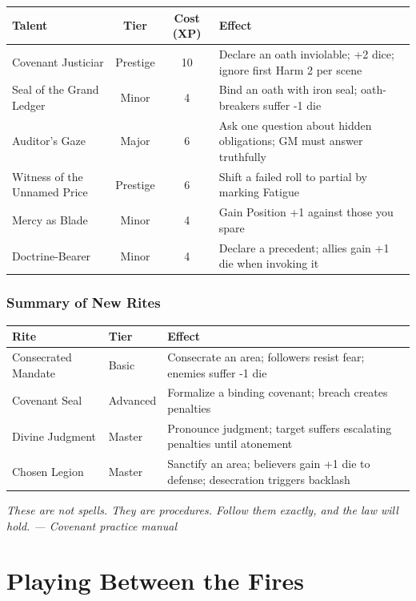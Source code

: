 \documentclass{book}
\newcommand{\citation}[1]{\textcolor{marginalia}{\small\textit{#1}}}
\begin{document}
\begin{tabularx}{\textwidth}{X c c X}
\toprule
\textbf{Talent} & \textbf{Tier} & \textbf{Cost (XP)} & \textbf{Effect} \\
\midrule
Covenant Justiciar & Prestige & 10 & Declare an oath inviolable; +2 dice; ignore first Harm 2 per scene \\
Seal of the Grand Ledger & Minor & 4 & Bind an oath with iron seal; oath-breakers suffer -1 die \\
Auditor's Gaze & Major & 6 & Ask one question about hidden obligations; GM must answer truthfully \\
Witness of the Unnamed Price & Prestige & 6 & Shift a failed roll to partial by marking Fatigue \\
Mercy as Blade & Minor & 4 & Gain Position +1 against those you spare \\
Doctrine-Bearer & Minor & 4 & Declare a precedent; allies gain +1 die when invoking it \\
\bottomrule
\end{tabularx}

\section{Summary of New Rites}

\begin{tabularx}{\textwidth}{X X p{6cm}}
\toprule
\textbf{Rite} & \textbf{Tier} & \textbf{Effect} \\
\midrule
Consecrated Mandate & Basic & Consecrate an area; followers resist fear; enemies suffer -1 die \\
Covenant Seal & Advanced & Formalize a binding covenant; breach creates penalties \\
Divine Judgment & Master & Pronounce judgment; target suffers escalating penalties until atonement \\
Chosen Legion & Master & Sanctify an area; believers gain +1 die to defense; desecration triggers backlash \\
\bottomrule
\end{tabularx}

\citation{These are not spells. They are procedures. Follow them exactly, and the law will hold. --- Covenant practice manual}

\part{Playing Between the Fires}
\end{document}
